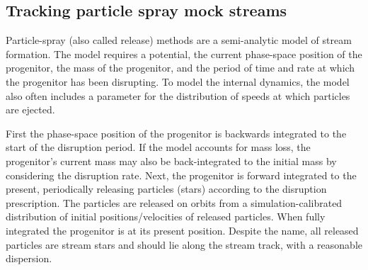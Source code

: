 \documentclass[fleqn,usenatbib]{mnras}
\begin{document}

  \subsection{Tracking particle spray mock streams}
  \label{sub:tracking_particle_spray_mock_streams}

    Particle-spray (also called release) methods are a semi-analytic model of
    stream formation. The model requires a potential, the current phase-space
    position of the progenitor, the mass of the progenitor, and the period of
    time and rate at which the progenitor has been disrupting. To model the
    internal dynamics, the model also often includes a parameter for the
    distribution of speeds at which particles are ejected.

    First the phase-space position of the progenitor is backwards integrated to
    the start of the disruption period. If the model accounts for mass loss, the
    progenitor's current mass may also be back-integrated to the initial mass by
    considering the disruption rate. Next, the progenitor is forward integrated
    to the present, periodically releasing particles (stars) according to the
    disruption prescription. The particles are released on orbits from a
    simulation-calibrated distribution of initial positions/velocities of
    released particles. When fully integrated the progenitor is at its present
    position. Despite the name, all released particles are stream stars and
    should lie along the stream track, with a reasonable dispersion.
\end{document}
